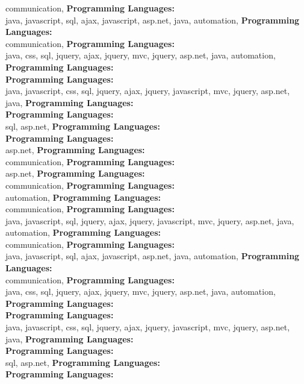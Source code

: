 communication, \textbf{Programming Languages:} \\
java, javascript, sql, ajax, javascript, asp.net, java, automation, \textbf{Programming Languages:} \\
communication, \textbf{Programming Languages:} \\
java, css, sql, jquery, ajax,  jquery, mvc, jquery, asp.net, java, automation, \textbf{Programming Languages:} \\
\textbf{Programming Languages:} \\
java, javascript, css, sql, jquery, ajax,  jquery, javascript, mvc, jquery, asp.net, java, \textbf{Programming Languages:} \\
\textbf{Programming Languages:} \\
sql, asp.net, \textbf{Programming Languages:} \\
\textbf{Programming Languages:} \\
asp.net, \textbf{Programming Languages:} \\
communication, \textbf{Programming Languages:} \\
asp.net, \textbf{Programming Languages:} \\
communication, \textbf{Programming Languages:} \\
automation, \textbf{Programming Languages:} \\
communication, \textbf{Programming Languages:} \\
java, javascript, sql, jquery, ajax,  jquery, javascript, mvc, jquery, asp.net, java, automation, \textbf{Programming Languages:} \\
communication, \textbf{Programming Languages:} \\
java, javascript, sql, ajax, javascript, asp.net, java, automation, \textbf{Programming Languages:} \\
communication, \textbf{Programming Languages:} \\
java, css, sql, jquery, ajax,  jquery, mvc, jquery, asp.net, java, automation, \textbf{Programming Languages:} \\
\textbf{Programming Languages:} \\
java, javascript, css, sql, jquery, ajax,  jquery, javascript, mvc, jquery, asp.net, java, \textbf{Programming Languages:} \\
\textbf{Programming Languages:} \\
sql, asp.net, \textbf{Programming Languages:} \\
\textbf{Programming Languages:} \\
